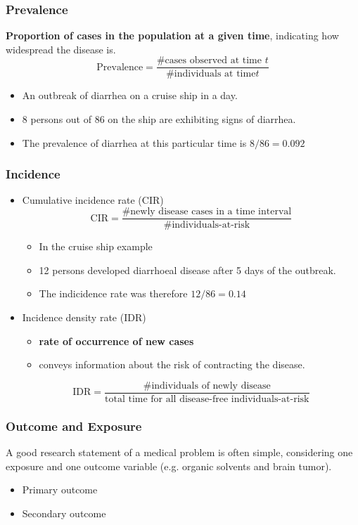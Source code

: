 \documentclass[table,10pt]{beamer}
\begin{document}
\begin{CJK*}{UTF8}{gbsn}
\begin{frame}[t]
\frametitle{Prevalence}
\textbf{Proportion of cases in the population at a given time}, indicating \alert{how widespread the disease is.}
$$
\textrm{Prevalence} = \frac{\mbox{\#cases observed at time } t}{\mbox{\#individuals at time} t}
$$
\begin{itemize}
	\item An outbreak of diarrhea on a cruise ship in a day.
	\item 8 persons out of 86 on the ship are exhibiting signs of diarrhea.
	\item The prevalence of diarrhea at this particular time is $8/86=0.092$
\end{itemize}
\end{frame}

\begin{frame}[t]
\frametitle{Incidence}
\begin{itemize}
	\item Cumulative incidence rate (CIR)
	$$
\textrm{CIR} = \frac{\mbox{\#newly disease cases in a time interval}}{\mbox{\#individuals-at-risk}}
	$$
	\begin{itemize}
		\item In the cruise ship example
		\item 12 persons developed diarrhoeal disease after 5 days of the outbreak.
		\item The indicidence rate was therefore $12/86=0.14$
	\end{itemize}
	\item Incidence density rate (IDR)
	\begin{itemize}
		\item \textbf{rate of occurrence of new cases}
		\item conveys information about the \alert{risk of 
			contracting the disease}. 
	\end{itemize}
	$$
\textrm{IDR} = \frac{\mbox{\#individuals of newly disease}}{\mbox{total time for all disease-free individuals-at-risk}}
	$$
\end{itemize}
\end{frame}

\begin{frame}
\frametitle{Outcome and Exposure}
A good research statement of a medical problem is often simple, considering one 
exposure and one outcome variable (e.g. organic solvents and brain tumor).

\begin{itemize}
	\item Primary outcome
	\item Secondary outcome
\end{itemize}


\end{frame}
\end{CJK*}
\end{document}
